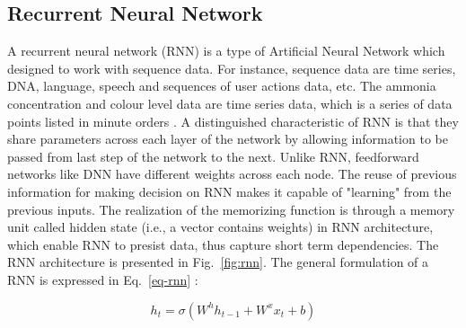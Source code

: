 
\subsection{Recurrent Neural Network}
A recurrent neural network (RNN) is a type of Artificial Neural Network which designed to work with sequence data. For instance, sequence data are time series, DNA, language, speech and sequences of user actions data, etc. The ammonia concentration and colour level data are time series data, which is a series of data points listed in minute orders \citep{dongesGuideRNNUnderstanding2021}. A distinguished characteristic of RNN is that they share parameters across each layer of the network by allowing information to be passed from last step of the network to the next. Unlike RNN, feedforward networks like DNN have different weights across each node. The reuse of previous information for making decision on RNN makes it capable of "learning" from the previous inputs. The realization of the memorizing function is through a memory unit called hidden state (i.e., a vector contains weights) in RNN architecture, which enable RNN to presist data, thus capture short term dependencies. The RNN architecture is presented in Fig.~\ref{fig:rnn}. The general formulation of a RNN is expressed in Eq.~\ref{eq-rnn} \citep{mamandipoorMonitoringDetectingFaults2020}:

\begin{equation}\label{eq-rnn}
  h_t=\sigma(W^hh_{t-1}+W^xx_t+b)
\end{equation}

